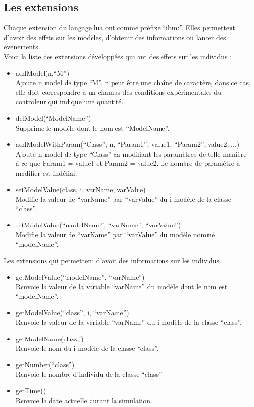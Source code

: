 \subsection{Les extensions}
Chaque extension du langage lua ont comme préfixe ``ibm:''. Elles permettent d'avoir des effets sur les modèles, d'obtenir des informations ou lancer des évènements.\\
Voici la liste des extensions développées qui ont des effets sur les individus :
\begin{itemize}[label=\textbullet,font=\large]
	\item addModel(n,``M'')\\
	Ajoute n model de type ``M''. n peut être une chaîne de caractère, dans ce cas, elle doit correspondre à un champs des conditions expérimentales du controleur qui indique une quantité.
	\item delModel(``ModelName'')\\
	Supprime le modèle dont le nom est ``ModelName''.
	\item addModelWithParam(``Class'', n, ``Param1'', value1, ``Param2'', value2, ...)\\
	Ajoute n model de type ``Class'' en modifiant les paramètres de telle manière à ce que Param1 = value1 et Param2 = value2. Le nombre de paramètre à modifier est indéfini.
	\item setModelValue(class, i, varName, varValue)\\
	Modifie la valeur de ``varName'' par ``varValue'' du i modèle de la classe ``class''.
	\item setModelValue(``modelName'', ``varName'', ``varValue'')\\
	Modifie la valeur de ``varName'' par ``varValue'' du modèle nommé ``modelName''.
\end{itemize}
Les extensions qui permettent d'avoir des informations sur les individus.
\begin{itemize}[label=\textbullet,font=\large]
	\item getModelValue(``modelName'', ``varName'')\\
	Renvoie la valeur de la variable ``varName'' du modèle dont le nom est ``modelName''.
	\item getModelValue(``class'', i, ``varName'')\\
	Renvoie la valeur de la variable ``varName'' du i modèle de la classe ``class''.
	\item getModelName(class,i)\\
	Renvoie le nom du i modèle de la classe ``class''.
	\item getNumber(``class'')\\
	Renvoie le nombre d'individu de la classe ``class''.
	\item getTime()\\
	Renvoie la date actuelle durant la simulation.
\end{itemize}
